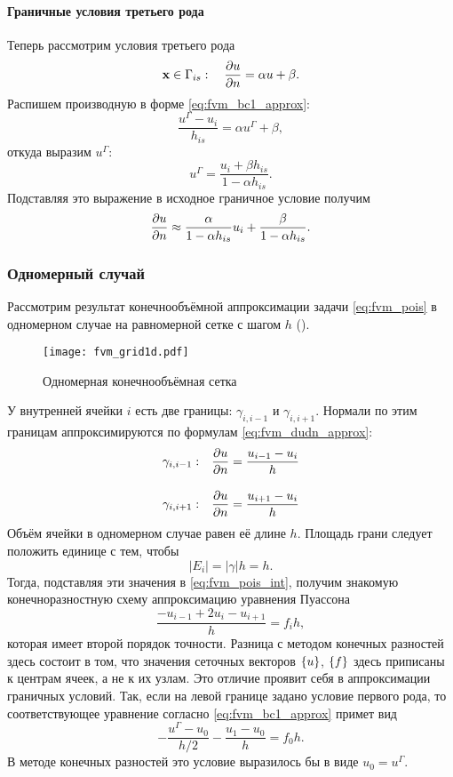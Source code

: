 \paragraph{Граничные условия третьего рода}
Теперь рассмотрим условия третьего рода
\begin{equation*}
\boldsymbol{\rm x} \in \Gamma_{is}: \quad \frac{\partial u}{\partial n} = \alpha u + \beta.
\end{equation*}
Распишем производную в форме \cref{eq:fvm_bc1_approx}:
$$
\frac{u^\Gamma - u_i}{h_{is}} = \alpha u^\Gamma + \beta,
$$
откуда выразим $u^\Gamma$:
$$
u^\Gamma =  \frac{u_i + \beta h_{is}}{1 - \alpha h_{is}}.
$$
Подставляя это выражение в исходное граничное условие получим
\begin{equation}
\label{eq:fvm_bc3_approx}
\frac{\partial u}{\partial n} \approx \frac{\alpha}{1 - \alpha h_{is}} u_i + \frac{\beta}{1 - \alpha h_{is}}.
\end{equation}

\subsubsection{Одномерный случай}
Рассмотрим результат конечнообъёмной аппроксимации
задачи \cref{eq:fvm_pois} в одномерном случае
на равномерной сетке с шагом $h$ ().

\begin{figure}[h!]
\centering
\texttt{[image: fvm\_grid1d.pdf]}
\caption{Одномерная конечнообъёмная сетка}
\label{fig:fvm_grid1d}
\end{figure}

У внутренней ячейки $i$ есть две границы: $\gamma_{i,i-1}$ и $\gamma_{i,i+1}$.
Нормали по этим границам аппроксимируются по формулам \cref{eq:fvm_dudn_approx}:
\begin{align*}
\gamma_{i,i-1}: \quad& \frac{\partial u}{\partial n} = \frac{u_{i-1}-u_{i}}{h} \\[10pt]
\gamma_{i,i+1}: \quad& \frac{\partial u}{\partial n} = \frac{u_{i+1}-u_{i}}{h}
\end{align*}
Объём ячейки в одномерном случае равен её длине $h$.
Площадь грани следует положить единице с тем, чтобы
$$
|E_i| = |\gamma| h = h.
$$
Тогда, подставляя эти значения в \cref{eq:fvm_pois_int},
получим знакомую конечноразностную схему аппроксимацию уравнения Пуассона
$$
\frac{-u_{i-1} + 2 u_i - u_{i+1}}{h} = f_i h,
$$
которая имеет второй порядок точности.
Разница с методом конечных разностей здесь состоит в том,
что значения сеточных векторов $\left\{u\right\}$, $\left\{f\right\}$ здесь
приписаны к центрам ячеек, а не к их узлам.
Это отличие проявит себя в аппроксимации граничных условий.
Так, если на левой границе задано условие первого рода, то соответствующее уравнение
согласно \cref{eq:fvm_bc1_approx}
примет вид
$$
-\frac{u^\Gamma - u_0}{h/2} - \frac{u_1 - u_0}{h} = f_0 h.
$$
В методе конечных разностей это условие выразилось бы в виде $u_0 = u^\Gamma$.

